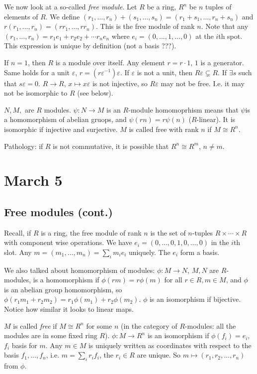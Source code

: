 \documentclass{article}
\theoremstyle{plain}
\theoremstyle{remark}
\newcommand{\ep}{{\varepsilon}}
\begin{document}
We now look at a so-called \emph{free module}.
Let $R$ be a ring, $R^n$ be $n$ tuples of elements of $R$.
We define $(r_1,\dots,r_n) + (s_1,\dots,s_n) = (r_1 + s_1,\dots,r_n+s_n)$
and $r(r_1,\dots,r_n) = (rr_1,\dots,rr_n)$.
This is the free module of rank $n$.
Note that any $(r_1,\dots,r_n) = r_1e_1 + r_2e_2 + \cdots r_ne_n$
where $e_i = (0,\dots,1,\dots,0)$ at the $i$th spot.
This expression is unique by definition (not a basis ???).

If $n =1 $, then $R$ is a module over itself.
Any element $r = r \cdot 1$, $1$ is a generator.
Same holds for a unit $\ep$, $r = (r\ep^{-1})\ep$.
If $\ep$ is not a unit, then $R\ep \subsetneq R$.
If $\exists s$ such that $s\ep = 0$.
$R \to R$, $x \mapsto x\ep$ is not injective,
so $R\ep$ may not be free.
I.e. it may not be isomorphic to $R$ (see below).

$N,M,$ are $R$ modules.
$\psi \colon N \to M$ is an $R$-module homomoprhism
means that $\psi$is a homomorphism of abelian gruops,
and $\psi(rn) = r\psi(n)$ ($R$-linear).
It is isomorphic if injective and surjective.
$M$ is called free with rank $n$ if $M \cong R^n$.

Pathology: if $R$ is not commutative, it is possible that
$R^n \cong R^m$, $n \neq m$.


\section{March 5}
\subsection{Free modules (cont.)}
Recall, if $R$ is a ring,
the free module of rank $n$ is the set of $n$-tuples
$R \times \cdots \times R$ with component wise operations.
We have $e_i = (0,\dots,0,1,0,\dots,0)$ in the $i$th slot.
Any $m = (m_1,\dots,m_n) = \sum_i m_i e_i$ uniquely.
The $e_i$ form a basis.

We also talked about homomorphism of modules:
$\phi \colon M \to N$, $M,N$ are $R$-modules, is a homomorphism
if $\phi(rm) = r\phi(m)$ for all $r \in R, m \in M$,
and $\phi$ is an abelian group homomorphism,
so $\phi(r_1m_1 + r_2m_2) = r_1\phi(m_1) + r_2\phi(m_2)$.
$\phi$ is an isomorphism if bijective.
Notice how similar it looks to linear maps.

$M$ is called \emph{free} if $M \cong R^n$ for some $n$
(in the category of $R$-modules: all the modules are in some fixed ring $R$).
$\phi \colon M \to R^n$ is an isomorphism if $\phi(f_i) = e_i$, $f_i$ basis for $m$.
Any $m \in M$ is uniquely written as coordinates with respect to the basis $f_1,\dots,f_n$,
i.e. $m = \sum_ir_if_i$, the $r_i \in R$ are unique.
So $m \mapsto (r_1,r_2,\dots,r_n)$ from $\phi$.
\end{document}

